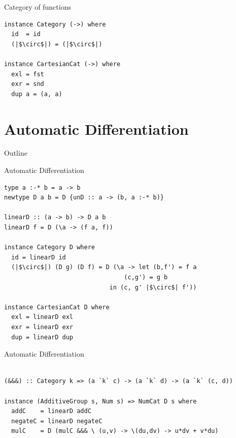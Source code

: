 \documentclass[12pt]{beamer}
\begin{document}
\begin{frame}[fragile]{Category of functions}
\begin{verbatim}
instance Category (->) where
  id  = id
  (|$\circ$|) = (|$\circ$|)

instance CartesianCat (->) where
  exl = fst
  exr = snd
  dup a = (a, a)
\end{verbatim}
\end{frame}

\section{Automatic Differentiation}

\begin{frame}{Outline}
\tableofcontents[currentsection]
\end{frame}

\begin{frame}[fragile]{Automatic Differentiation}
\begin{verbatim}
type a :-* b = a -> b
newtype D a b = D {unD :: a -> (b, a :-* b)}

linearD :: (a -> b) -> D a b
linearD f = D (\a -> (f a, f))

instance Category D where
  id = linearD id
  (|$\circ$|) (D g) (D f) = D (\a -> let (b,f') = f a
                                 (c,g') = g b
                             in (c, g' |$\circ$| f'))
                             
instance CartesianCat D where
  exl = linearD exl
  exr = linearD exr
  dup = linearD dup
\end{verbatim}
\end{frame}

\begin{frame}[fragile]{Automatic Differentiation}
  
\begin{verbatim}

(&&&) :: Category k => (a `k` c) -> (a `k` d) -> (a `k` (c, d))
  
instance (AdditiveGroup s, Num s) => NumCat D s where
  addC    = linearD addC
  negateC = linearD negateC
  mulC    = D (mulC &&& \ (u,v) -> \(du,dv) -> u*dv + v*du)
\end{verbatim}
\end{frame}
\end{document}
